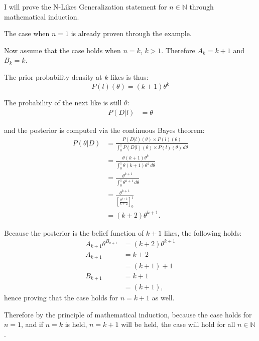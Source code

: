 \documentclass[a4paper,11pt]{article}
\newcommand*\Eval[3]{\left[#1\right]_{#3}^{#2}}
\newenvironment{Proof}[1][Proof]
{\proof[#1]\leftskip=1cm\rightskip=1cm}
{\endproof}
\begin{document}
\begin{Proof}
	I will prove the N-Likes Generalization statement for $n\in \mathbb{N}$ through mathematical induction.

	The case when $n=1$ is already proven through the example.

	Now assume that the case holds when $n=k$, $k > 1$. Therefore $A_k = k+1$ and $B_k = k$.

	The prior probability density at $k$ likes is thus:
	\[
	P(l)(\theta) = (k+1) \theta ^{k}
	\]

	The probability of the next like is still $\theta$:
	\begin{align*}
	P(D|l) &= \theta
	\end{align*}

	and the posterior is computed via the continuous Bayes theorem:
	\begin{align*}
	P(\theta|D) &= \frac{P(D|l)(\theta) \times P(l)(\theta)}{\int_{0}^{1} P(D|l)(\theta) \times P(l)(\theta) \, d\theta}\\
	&= \frac{\theta (k+1)\theta^k}{ \int_0^1 \theta (k+1)\theta^k \, d\theta}\\
	&= \frac{\theta^{k+1}}{\int_0^1 \theta^{k+1} \, d\theta}\\
	&= \frac{\theta^{k+1}}{\Eval{\frac{\theta^{k+2}}{k+2}}{1}{0}}\\
	&= (k+2) \theta^{k+1}.
	\end{align*}

	Because the posterior is the belief function of $k+1$ likes, the following holds:
	\begin{align*}
	A_{k+1} \theta^{B_{k+1}} &= (k+2) \theta ^{k+1}\\
	A_{k+1} &= k+2\\
	&= (k+1) + 1\\
	B_{k+1} &= k+1\\
	&= (k+1),
	\end{align*}
	hence proving that the case holds for $n=k+1$ as well.

	Therefore by the principle of mathematical induction, because the case holds for $n=1$, and if $n=k$ is held, $n=k+1$ will be held, the case will hold for all $n\in\mathbb{N}$.
\end{Proof}




\end{document}
